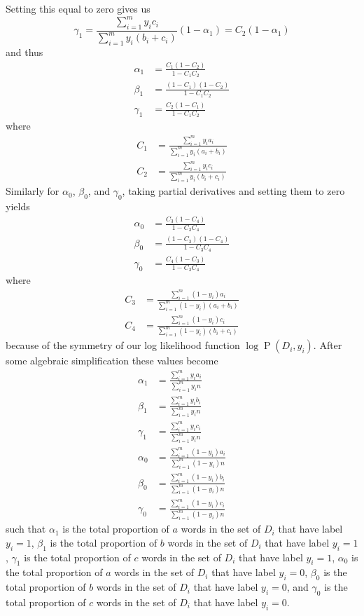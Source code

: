 \documentclass[12pt]{article}
\begin{document}
Setting this equal to zero gives us
\[\gamma_1=\frac{\sum_{i=1}^m y_ic_i}{\sum_{i=1}^m y_i(b_i+c_i)}(1-\alpha_1)=C_2(1-\alpha_1)\]
and thus
\begin{align*}
        \alpha_1&=\frac{C_1(1-C_2)}{1-C_1C_2}\\
        \beta_1&=\frac{(1-C_1)(1-C_2)}{1-C_1C_2}\\
        \gamma_1&=\frac{C_2(1-C_1)}{1-C_1C_2}
\end{align*}
where
\begin{align*}
        C_1&=\frac{\sum_{i=1}^m y_ia_i}{\sum_{i=1}^m y_i(a_i+b_i)}\\
        C_2&=\frac{\sum_{i=1}^m y_ic_i}{\sum_{i=1}^m y_i(b_i+c_i)}
\end{align*}
Similarly for \(\alpha_0\), \(\beta_0\), and \(\gamma_0\), taking partial derivatives and setting them to zero yields
\begin{align*}
        \alpha_0&=\frac{C_3(1-C_4)}{1-C_3C_4}\\
        \beta_0&=\frac{(1-C_3)(1-C_4)}{1-C_3C_4}\\
        \gamma_0&=\frac{C_4(1-C_3)}{1-C_3C_4}
\end{align*}
where
\begin{align*}
        C_3&=\frac{\sum_{i=1}^m (1-y_i)a_i}{\sum_{i=1}^m (1-y_i)(a_i+b_i)}\\
        C_4&=\frac{\sum_{i=1}^m (1-y_i)c_i}{\sum_{i=1}^m (1-y_i)(b_i+c_i)}
\end{align*}
because of the symmetry of our log likelihood function \(\log \operatorname{P}(D_i, y_i)\). After some algebraic simplification
these values become
\begin{align*}
        \alpha_1&=\frac{\sum_{i=1}^m y_ia_i}{\sum_{i=1}^m y_in}\\
        \beta_1&=\frac{\sum_{i=1}^m y_ib_i}{\sum_{i=1}^m y_in}\\
        \gamma_1&=\frac{\sum_{i=1}^m y_ic_i}{\sum_{i=1}^m y_in}\\
        \alpha_0&=\frac{\sum_{i=1}^m (1-y_i)a_i}{\sum_{i=1}^m (1-y_i)n}\\
        \beta_0&=\frac{\sum_{i=1}^m (1-y_i)b_i}{\sum_{i=1}^m (1-y_i)n}\\
        \gamma_0&=\frac{\sum_{i=1}^m (1-y_i)c_i}{\sum_{i=1}^m (1-y_i)n}
\end{align*}
such that \(\alpha_1\) is the total proportion of \(a\) words in the set of \(D_i\) that have label \(y_i=1\), \(\beta_1\) is the total
proportion of \(b\) words in the set of \(D_i\) that have label \(y_i=1\), \(\gamma_1\) is the total proportion of \(c\) words in the set
of \(D_i\) that have label \(y_i=1\), \(\alpha_0\) is the total proportion of \(a\) words in the set of \(D_i\) that have label \(y_i=0\),
\(\beta_0\) is the total proportion of \(b\) words in the set of \(D_i\) that have label \(y_i=0\), and
\(\gamma_0\) is the total proportion of \(c\) words in the set of \(D_i\) that have label \(y_i=0\).
\end{document}

